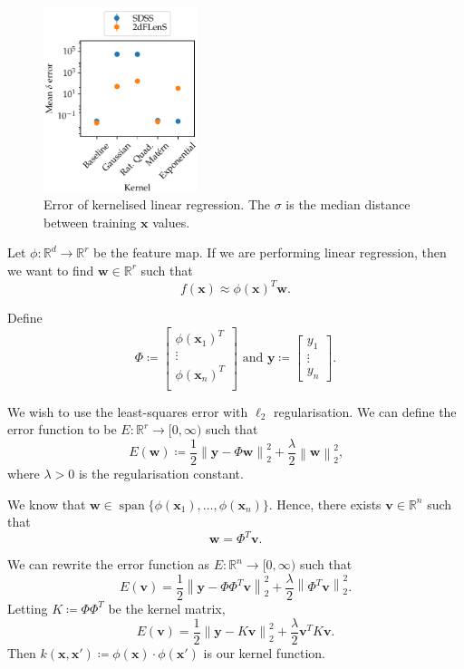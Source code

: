\documentclass[11pt,twoside,openright]{report}
\newcommand\bbR{\mathbb{R}}
\newcommand\bv{\mathbf{v}}
\newcommand\bw{\mathbf{w}}
\newcommand\bx{\mathbf{x}}
\newcommand\by{\mathbf{y}}
\newcommand\norm[1]{\left\|#1\right\|}
\DeclareMathOperator{\spn}{span}
\begin{document}
  \begin{figure}
    \centering
    \includegraphics[width=0.4\textwidth]{linreg_kernelised.pdf}
    \caption{Error of kernelised linear regression. The $\sigma$ is the median distance between training $\bx$ values.}
    \label{fig:linreg_kernelised}
  \end{figure}

Let $\phi : \bbR^d \to \bbR^r$ be the feature map. If we are performing linear regression, then we want to find $\bw \in \bbR^r$ such that \[
    f(\bx) \approx \phi(\bx)^T \bw \text{.}
\]

Define \[
    \Phi \coloneqq \begin{bmatrix}
        \phi(\bx_1)^T \\
        \vdots \\
        \phi(\bx_n)^T \\
    \end{bmatrix} \text{ and }\by \coloneqq \begin{bmatrix}
        y_1 \\
        \vdots \\
        y_n
    \end{bmatrix} \text{.}
\]

We wish to use the least-squares error with $\ell_2$ regularisation. We can define the error function to be $E : \bbR^r \to [0, \infty)$ such that \[
    E(\bw) \coloneqq \frac{1}{2}\norm{\by - \Phi\bw}_2^2 + \frac{\lambda}{2} \norm{\bw}_2^2 \text{,}
\] where $\lambda > 0$ is the regularisation constant.

We know that $\bw \in \spn\{\phi(\bx_1), \dots, \phi(\bx_n)\}$. Hence, there exists $\bv \in \bbR^n$ such that \[
    \bw = \Phi^T\bv \text{.}
\]

We can rewrite the error function as $E : \bbR^n \to [0, \infty)$ such that \[
    E(\bv) = \frac{1}{2}\norm{\by - \Phi\Phi^T\bv}_2^2 + \frac{\lambda}{2} \norm{\Phi^T\bv}_2^2 \text{.}
\] Letting $K \coloneqq \Phi\Phi^T$ be the kernel matrix,\[
    E(\bv) = \frac{1}{2}\norm{\by - K\bv}_2^2 + \frac{\lambda}{2} \bv^T K \bv \text{.}
\] Then $k(\bx, \bx') \coloneqq \phi(\bx) \cdot \phi(\bx')$ is our kernel function.
\end{document}
